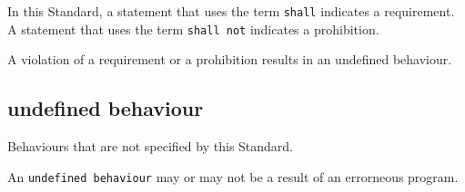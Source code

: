 In this Standard, a statement that uses the term \texttt{shall} indicates a requirement.
A statement that uses the term \texttt{shall not} indicates a prohibition.

A violation of a requirement or a prohibition results in an undefined behaviour.


\subsection{{\ttfamily undefined behaviour}}

Behaviours that are not specified by this Standard.

\inlinenote An \texttt{undefined behaviour} may or may not be a result of an errorneous
program.